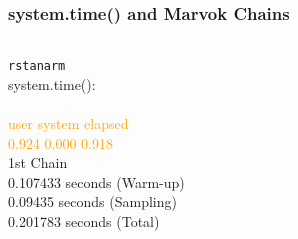 \documentclass[handout]{beamer}\usepackage[]{graphicx}\usepackage[]{color}
\begin{document}
\begin{frame}
\frametitle{system.time() and Marvok Chains}

\begin{columns}[onlytextwidth,t]
\begin{column}{0.48\textwidth}
\texttt{rstanarm}\\
system.time():   \\
 \\
 \textcolor{orange}{user  system elapsed \\
  0.924   0.000   0.918 }  \\
\vskip 1.2cm               
1st Chain\\
               0.107433 seconds (Warm-up) \\
               0.09435 seconds (Sampling) \\
               0.201783 seconds (Total) 

\end{column}

\end{columns}

\end{frame}

\end{document}
